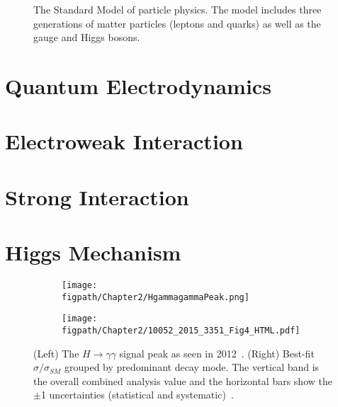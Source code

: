\begin{figure}[!hbt]
	\centering
	\resizebox{0.95\textwidth}{!}{}
	\caption{The Standard Model of particle physics. The model includes three generations of matter particles (leptons and quarks) as well as the gauge and Higgs bosons.}
	\label{fig:standard_model}
\end{figure}

\section{Quantum Electrodynamics}
\section{Electroweak Interaction}
\section{Strong Interaction}
\section{Higgs Mechanism}


\begin{figure}[!hbt]
    \centering
    \begin{subfigure}[t]{0.48\textwidth}
        \texttt{[image: \\figpath/Chapter2/HgammagammaPeak.png]}
        \caption{}
        \label{fig:HgammagammaPeak}
    \end{subfigure}
    \begin{subfigure}[t]{0.48\textwidth}
        \texttt{[image: \\figpath/Chapter2/10052\_2015\_3351\_Fig4\_HTML.pdf]}
        \caption{}
        \label{fig:HiggsSignalStrength}
    \end{subfigure}
    \caption{(Left) The $H\rightarrow\gamma\gamma$ signal peak as seen in 2012~\cite{Hgammagamma}. (Right) Best-fit $\sigma/\sigma_{SM}$ grouped by predominant decay mode. The vertical band is the overall combined analysis value and the horizontal bars show the $\pm$1 uncertainties (statistical and systematic)~\cite{Khachatryan2015}.}
    \label{fig:HiggsIn2012}
\end{figure}




